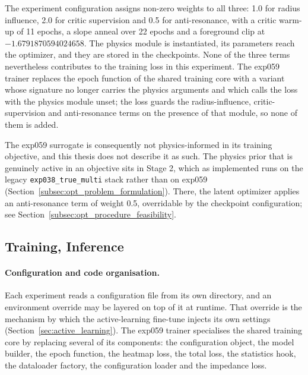 The experiment configuration assigns non-zero weights to all three: 1.0 for radius influence, 2.0 for
critic supervision and 0.5 for anti-resonance, with a critic warm-up of 11 epochs, a slope anneal
over 22 epochs and a foreground clip at $-1.6791870594024658$. The physics module is instantiated,
its parameters reach the optimizer, and they are stored in the checkpoints. None of the three terms
nevertheless contributes to the training loss in this experiment. The exp059 trainer replaces the
epoch function of the shared training core with a variant whose signature no longer carries the
physics arguments and which calls the loss with the physics module unset; the loss guards the
radius-influence, critic-supervision and anti-resonance terms on the presence of that module, so none
of them is added.

The exp059 surrogate is consequently not physics-informed in its training objective, and this thesis
does not describe it as such. The physics prior that is genuinely active in an objective sits in
Stage 2, which as implemented runs on the legacy \texttt{exp038\_true\_multi} stack rather than on
exp059 (Section~\ref{subsec:opt_problem_formulation}). There, the latent optimizer applies an
anti-resonance term of weight 0.5, overridable by the checkpoint configuration; see
Section~\ref{subsec:opt_procedure_feasibility}.

\subsection{Training, Inference}
\label{subsec:training_inference}

\paragraph{Configuration and code organisation.} Each experiment reads a configuration file from its
own directory, and an environment override may be layered on top of it at runtime. That override is
the mechanism by which the active-learning fine-tune injects its own settings
(Section~\ref{sec:active_learning}). The exp059 trainer specialises the shared training core by
replacing several of its components: the configuration object, the model builder, the epoch function,
the heatmap loss, the total loss, the statistics hook, the dataloader factory, the configuration
loader and the impedance loss.

